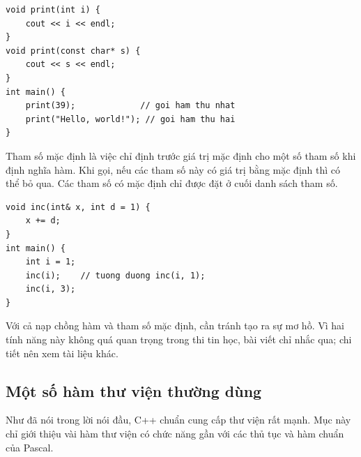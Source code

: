 \documentclass[11pt]{article}
\newcommand{\cpp}{C++}
\newcommand{\pascal}{Pascal}
\begin{document}
\begin{verbatim}
void print(int i) {
    cout << i << endl;
}
void print(const char* s) {
    cout << s << endl;
}
int main() {
    print(39);             // goi ham thu nhat
    print("Hello, world!"); // goi ham thu hai
}
\end{verbatim}

Tham số mặc định là việc chỉ định trước giá trị mặc định cho một số tham số
khi định nghĩa hàm. Khi gọi, nếu các tham số này có giá trị bằng mặc định thì
có thể bỏ qua. Các tham số có mặc định chỉ được đặt ở cuối danh sách tham số.

\begin{verbatim}
void inc(int& x, int d = 1) {
    x += d;
}
int main() {
    int i = 1;
    inc(i);    // tuong duong inc(i, 1);
    inc(i, 3);
}
\end{verbatim}

Với cả nạp chồng hàm và tham số mặc định, cần tránh tạo ra sự mơ hồ. Vì hai
tính năng này không quá quan trọng trong thi tin học, bài viết chỉ nhắc qua;
chi tiết nên xem tài liệu khác.

\subsection{Một số hàm thư viện thường dùng}

Như đã nói trong lời nói đầu, \cpp{} chuẩn cung cấp thư viện rất mạnh. Mục
này chỉ giới thiệu vài hàm thư viện có chức năng gần với các thủ tục và hàm
chuẩn của \pascal{}.
\end{document}
